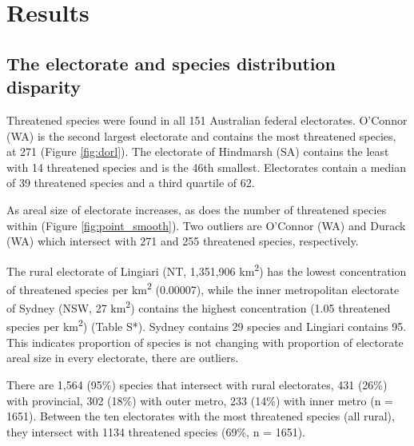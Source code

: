 \documentclass[a4paper,11pt]{article}
\begin{document}

\section{Results}

\subsection{The electorate and species distribution disparity}

Threatened species were found in all 151 Australian federal electorates. O'Connor (WA) is the second largest electorate and contains the most threatened species, at 271 (Figure \ref{fig:dorl}). The electorate of Hindmarsh (SA) contains the least with 14 threatened species and is the 46th smallest. Electorates contain a median of 39 threatened species and a third quartile of 62.

As areal size of electorate increases, as does the number of threatened species within (Figure \ref{fig:point_smooth}). Two outliers are O'Connor (WA) and Durack (WA) which intersect with 271 and 255 threatened species, respectively.

The rural electorate of Lingiari (NT, 1,351,906 km\textsuperscript{2}) has the lowest concentration of threatened species per km\textsuperscript{2} (0.00007), while the inner metropolitan electorate of Sydney (NSW, 27 km\textsuperscript{2}) contains the highest concentration (1.05 threatened species per km\textsuperscript{2}) (Table S*). Sydney contains 29 species and Lingiari contains 95. This indicates proportion of species is not changing with proportion of electorate areal size in every electorate, there are outliers.

There are 1,564 (95\%) species that intersect with rural electorates, 431 (26\%) with provincial, 302 (18\%) with outer metro, 233 (14\%) with inner metro (n = 1651). Between the ten electorates with the most threatened species (all rural), they intersect with 1134 threatened species (69\%, n = 1651).
\end{document}
